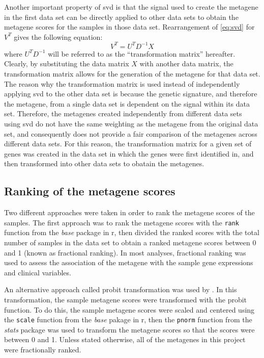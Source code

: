 Another important property of \gls{svd} is that the signal used to create the metagene in the first data set can be directly applied to other data sets to obtain the metagene scores for the samples in those data set.
Rearrangement of \cref{eq:svd} for $V^T$ gives the following equation:
\begin{equation}
	\label{eq:transmat}
	V^T = U^{T}D^{-1}X
\end{equation}
where $U^{T}D^{-1}$ will be referred to as the ``transformation matrix'' hereafter.
Clearly, by substituting the data matrix $X$ with another data matrix, the transformation matrix allows for the generation of the metagene for that data set.
The reason why the transformation matrix is used instead of independently applying \gls{svd} to the other data set is because the genetic signature, and therefore the metagene, from a single data set is dependent on the signal within its data set.
Therefore, the metagenes created independently from different data sets using \gls{svd} do not have the same weighting as the metagene from the original data set, and consequently does not provide a fair comparison of the metagenes across different data sets.
For this reason, the transformation matrix for a given set of genes was created in the data set in which the genes were first identified in, and then transformed into other data sets to obatain the metagenes.

\subsection{Ranking of the metagene scores}
\label{sub:ranking_of_the_metagene_scores}

Two different approaches were taken in order to rank the metagene scores of the samples.
The first approach was to rank the metagene scores with the \texttt{rank} function from the \textit{base} package in \gls{r}, then divided the ranked scores with the total number of samples in the data set to obtain a ranked metagene scores between 0 and 1 (known as fractional ranking).
In most analyses, fractional ranking was used to assess the association of the metagene with the sample gene expressions and clinical variables.

An alternative approach called probit transformation was used by \citet{Gatza2010a}.
In this transformation, the sample metagene scores were transformed with the probit function.
To do this, the sample metagene scores were scaled and centered using the \texttt{scale} function from the \textit{base} pakage in \gls{r}, then the \texttt{pnorm} function from the \textit{stats} package was used to transform the metagene scores so that the scores were between 0 and 1.
Unless stated otherwise, all of the metagenes in this project were fractionally ranked.

